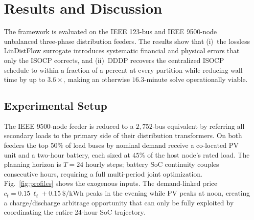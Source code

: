 %

\section{Results and Discussion}
\label{sec:results}

The framework is evaluated on the IEEE 123-bus and IEEE 9500-node unbalanced
three-phase distribution feeders. The results show that (i)~the lossless
LinDistFlow surrogate introduces systematic financial and physical errors that
only the ISOCP corrects, and (ii)~DDDP recovers the centralized ISOCP schedule
to within a fraction of a percent at every partition while reducing wall time by
up to $3.6\times$, making an otherwise $16.3$-minute solve operationally viable.

\subsection{Experimental Setup}
\label{ssec:setup}

The IEEE 9500-node feeder is reduced to a $2{,}752$-bus equivalent by referring
all secondary loads to the primary side of their distribution transformers.
On both feeders the top $50\%$ of load buses by nominal demand receive a
co-located PV unit and a two-hour battery, each sized at $45\%$ of the host
node's rated load. The planning horizon is $T\!=\!24$ hourly steps; battery
SoC continuity couples consecutive hours, requiring a full multi-period joint
optimization. Fig.~\ref{fig:profiles} shows the exogenous inputs. The
demand-linked price $c_t = 0.15\,\ell_t + 0.15~\text{\$/kWh}$ peaks in the
evening while PV peaks at noon, creating a charge/discharge arbitrage
opportunity that can only be fully exploited by coordinating the entire 24-hour
SoC trajectory.

